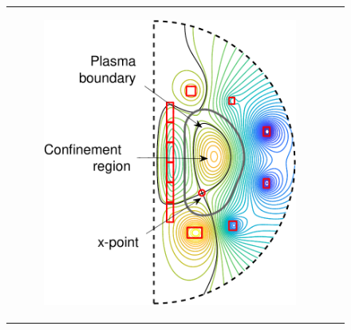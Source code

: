 \documentclass{beamer}
\begin{document}
\begin{frame}[t]
\begin{minipage}[t]{\linewidth}
\begin{columns}
        \begin{column}{0.5\linewidth}
        \vspace{-6mm}
            \begin{figure}[H]	
                \centering
                \hspace{-17mm}
                \begin{tabular}{cc}
                    \begin{subfigure}{0.5\textwidth}
                    \includegraphics[height=1.8\linewidth]{FreeBoundary_contoursWstructures}
                    \end{subfigure}
                \end{tabular}
            \end{figure}
        \end{column}
    \end{columns}
\end{minipage}
\end{frame}
\end{document}
